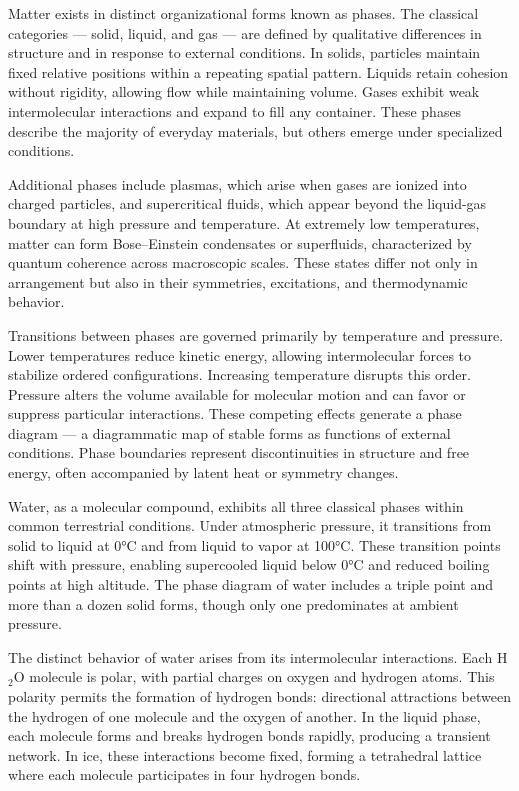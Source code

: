 Matter exists in distinct organizational forms known as phases. The classical categories — solid, liquid, and gas — are defined by qualitative differences in structure and in response to external conditions. In solids, particles maintain fixed relative positions within a repeating spatial pattern. Liquids retain cohesion without rigidity, allowing flow while maintaining volume. Gases exhibit weak intermolecular interactions and expand to fill any container. These phases describe the majority of everyday materials, but others emerge under specialized conditions.

Additional phases include plasmas, which arise when gases are ionized into charged particles, and supercritical fluids, which appear beyond the liquid-gas boundary at high pressure and temperature. At extremely low temperatures, matter can form Bose–Einstein condensates or superfluids, characterized by quantum coherence across macroscopic scales. These states differ not only in arrangement but also in their symmetries, excitations, and thermodynamic behavior.

Transitions between phases are governed primarily by temperature and pressure. Lower temperatures reduce kinetic energy, allowing intermolecular forces to stabilize ordered configurations. Increasing temperature disrupts this order. Pressure alters the volume available for molecular motion and can favor or suppress particular interactions. These competing effects generate a phase diagram — a diagrammatic map of stable forms as functions of external conditions. Phase boundaries represent discontinuities in structure and free energy, often accompanied by latent heat or symmetry changes.

Water, as a molecular compound, exhibits all three classical phases within common terrestrial conditions. Under atmospheric pressure, it transitions from solid to liquid at 0°C and from liquid to vapor at 100°C. These transition points shift with pressure, enabling supercooled liquid below 0°C and reduced boiling points at high altitude. The phase diagram of water includes a triple point and more than a dozen solid forms, though only one predominates at ambient pressure.

The distinct behavior of water arises from its intermolecular interactions. Each H\(_2\)O molecule is polar, with partial charges on oxygen and hydrogen atoms. This polarity permits the formation of hydrogen bonds: directional attractions between the hydrogen of one molecule and the oxygen of another. In the liquid phase, each molecule forms and breaks hydrogen bonds rapidly, producing a transient network. In ice, these interactions become fixed, forming a tetrahedral lattice where each molecule participates in four hydrogen bonds.

